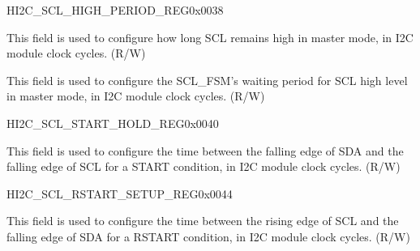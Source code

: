 \begin{register}{H}{I2C\_SCL\_HIGH\_PERIOD\_REG}{0x0038}\label{regdesc:I2CSCLHIGHPERIODREG}
%
%
%
\regnewline%
\begin{regdesc}\begin{reglist}
\label{fielddesc:I2CSCLHIGHPERIOD}\item [I2C\_SCL\_HIGH\_PERIOD] This field is used to configure how long SCL remains high in master mode, in I2C module clock cycles. (R/W)
\label{fielddesc:I2CSCLWAITHIGHPERIOD}\item [I2C\_SCL\_WAIT\_HIGH\_PERIOD] This field is used to configure the SCL\_FSM's waiting period for SCL high level in master mode, in I2C module clock cycles. (R/W)
\end{reglist}\end{regdesc}
\end{register}


\begin{register}{H}{I2C\_SCL\_START\_HOLD\_REG}{0x0040}\label{regdesc:I2CSCLSTARTHOLDREG}
%
%
\regnewline%
\begin{regdesc}\begin{reglist}
\label{fielddesc:I2CSCLSTARTHOLDTIME}\item [I2C\_SCL\_START\_HOLD\_TIME] This field is used to configure the time between the falling edge
of SDA and the falling edge of SCL for a START condition, in I2C module clock cycles. (R/W)
\end{reglist}\end{regdesc}
\end{register}


\begin{register}{H}{I2C\_SCL\_RSTART\_SETUP\_REG}{0x0044}\label{regdesc:I2CSCLRSTARTSETUPREG}
%
%
\regnewline%
\begin{regdesc}\begin{reglist}
\label{fielddesc:I2CSCLRSTARTSETUPTIME}\item [I2C\_SCL\_RSTART\_SETUP\_TIME] This field is used to configure the time between the rising
edge of SCL and the falling edge of SDA for a RSTART condition, in I2C module clock cycles. (R/W)
\end{reglist}\end{regdesc}
\end{register}


